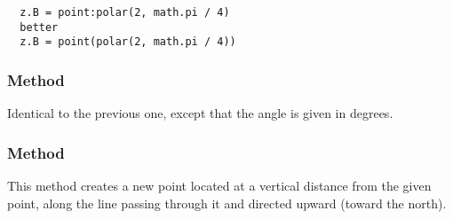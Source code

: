 \vspace{1em}

\begin{mybox}
\begin{verbatim}
  z.B = point:polar(2, math.pi / 4)
  better
  z.B = point(polar(2, math.pi / 4))
\end{verbatim}
\end{mybox}

\begin{tkzexample}[latex = 7cm]
\begin{center}
\end{center}

\end{tkzexample}

\subsubsection{Method }
\label{ssub:method_point_polar_deg}

Identical to the previous one, except that the angle is given in degrees.

\begin{tkzexample}[latex=7cm]
\begin{center}
\end{center}
\end{tkzexample}

\subsubsection{Method }
\label{ssub:example_method_point_north_d}

This method creates a new point located at a vertical distance from the given point, along the line passing through it and directed upward (toward the north).

